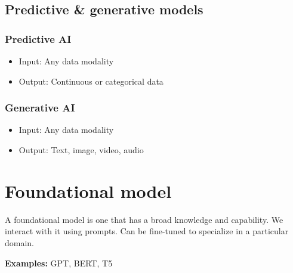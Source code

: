 \subsection{Predictive \& generative models} \label{sec:pred-gen}
\subsubsection*{Predictive AI}
\begin{itemize}
    \item Input: Any data modality
    \item Output: Continuous or categorical data
\end{itemize}
\subsubsection*{Generative AI}
\begin{itemize}
    \item Input: Any data modality
    \item Output: Text, image, video, audio
\end{itemize}

\section{Foundational model} \label{sec:found}
A foundational model is one that has a broad knowledge and capability.
We interact with it using prompts.
Can be fine-tuned to specialize in a particular domain.

\textbf{Examples:} GPT, BERT, T5
